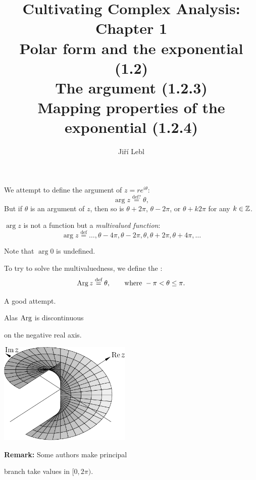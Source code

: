 \documentclass[10pt,aspectratio=169]{beamer}
\author{Ji\v{r}\'i Lebl}
\institute[OSU]{%
Departemento pri Matematiko de Oklahoma {\^S}tata Universitato}
\title{Cultivating Complex Analysis: Chapter 1\\%
Polar form and the exponential (1.2)\\%
The argument (1.2.3)\\%
Mapping properties of the exponential (1.2.4)}
\date{}
\begin{document}
\begin{frame}
\titlepage
\end{frame}

\begin{frame}
We attempt to define the argument of $z = re^{i\theta}$:
\begin{equation*}
\arg z
\overset{\text{def?}}{=}
\theta ,
\end{equation*}
\pause
But if $\theta$ is an argument of $z$,
then so is $\theta+2\pi$, $\theta-2\pi$, or $\theta + k 2\pi$ for any $k \in
{\mathbb{Z}}$.

\medskip
\pause

$\arg z$ is not a function but a \emph{multivalued function}:
\begin{equation*}
\arg z
\overset{\text{def}}{=}
\ldots,\theta - 4\pi,
\theta - 2\pi,
\theta ,
\theta + 2\pi,
\theta + 4\pi, \ldots
\end{equation*}

\pause

Note that $\arg 0$ is undefined.

\end{frame}

\begin{frame}
To try to solve the multivaluedness, we define the
\emph{}:
\begin{equation*}
\operatorname{Arg} z
\overset{\text{def}}{=}
\theta, \qquad \text{where } -\pi < \theta \leq \pi.
\end{equation*}

\pause

A good attempt.

\medskip

Alas $\operatorname{Arg}$ is discontinuous

on the negative real axis.


\vspace*{-0.5in}
\hspace*{2.7in}%
\includegraphics[width=2.5in]{../figures/arggraph}

\pause

\vspace*{-0.8in}

\textbf{Remark:} Some authors make principal

branch take values in $[0,2\pi)$.

\end{frame}
\end{document}
